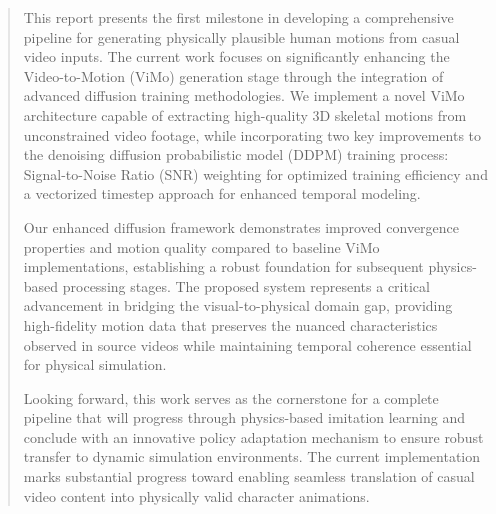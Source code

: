 \documentclass[MTech]{iittpdiss}
\begin{document}
\begin{abstract}
This report presents the first milestone in developing a comprehensive pipeline for generating physically plausible human motions from casual video inputs. The current work focuses on significantly enhancing the Video-to-Motion (ViMo) generation stage through the integration of advanced diffusion training methodologies. We implement a novel ViMo architecture capable of extracting high-quality 3D skeletal motions from unconstrained video footage, while incorporating two key improvements to the denoising diffusion probabilistic model (DDPM) training process: Signal-to-Noise Ratio (SNR) weighting for optimized training efficiency and a vectorized timestep approach for enhanced temporal modeling.

Our enhanced diffusion framework demonstrates improved convergence properties and motion quality compared to baseline ViMo implementations, establishing a robust foundation for subsequent physics-based processing stages. The proposed system represents a critical advancement in bridging the visual-to-physical domain gap, providing high-fidelity motion data that preserves the nuanced characteristics observed in source videos while maintaining temporal coherence essential for physical simulation.

Looking forward, this work serves as the cornerstone for a complete pipeline that will progress through physics-based imitation learning and conclude with an innovative policy adaptation mechanism to ensure robust transfer to dynamic simulation environments. The current implementation marks substantial progress toward enabling seamless translation of casual video content into physically valid character animations.
\end{abstract}

\begin{singlespace}
\vspace{4em}
\tableofcontents
\thispagestyle{empty}
\makeatletter
\let\origclearpage\clearpage
\let\clearpage\relax

\vspace{10em}
\listoffigures
{}
\let\clearpage\origclearpage
\makeatother
\end{singlespace}
\newpage


\end{document}
